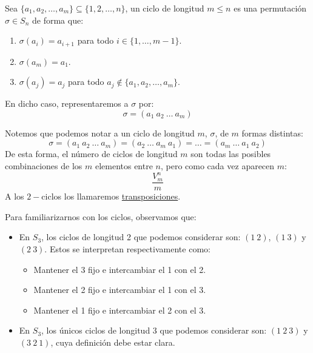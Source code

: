 \begin{definicion}[Ciclo]
    Sea $\{a_1,a_2,\ldots,a_m\}\subseteq \{1,2,\ldots,n\}$, un ciclo de longitud $m\leq n$ es una permutación $\sigma\in S_n$ de forma que:
    \begin{enumerate}
        \item $\sigma(a_i) = a_{i+1}$ para todo $i \in \{1,\ldots,m-1\}$.
        \item $\sigma(a_m) = a_1$.
        \item $\sigma(a_j) = a_j$ para todo $a_j \notin \{a_1,a_2,\ldots,a_m\}$.
    \end{enumerate}
    En dicho caso, representaremos a $\sigma$ por:
    \begin{equation*}
        \sigma = (a_1\ a_2\ \ldots\ a_m)
    \end{equation*}
\end{definicion}

\begin{observacion}
    Notemos que podemos notar a un ciclo de longitud $m$, $\sigma$, de $m$ formas distintas:
    \begin{equation*}
        \sigma = (a_1\ a_2\ \ldots\ a_m) = (a_2\ \ldots\ a_m\ a_1) = \ldots = (a_m\ \ldots\ a_1\ a_2)
    \end{equation*}
    De esta forma, el número de ciclos de longitud $m$ son todas las posibles combinaciones de los $m$ elementos entre $n$, pero como cada vez aparecen $m$:
    \begin{equation*}
        \dfrac{V_m^n}{m}
    \end{equation*}
    A los $2-$ciclos los llamaremos \underline{transposiciones}.
\end{observacion}

\begin{ejemplo}
    Para familiarizarnos con los ciclos, observamos que:
    \begin{itemize}
        \item En $S_3$, los ciclos de longitud 2 que podemos considerar son: $(1\ 2)$, $(1\ 3)$ y $(2\ 3)$. Estos se interpretan respectivamente como:
            \begin{itemize}
                \item Mantener el 3 fijo e intercambiar el 1 con el 2.
                \item Mantener el 2 fijo e intercambiar el 1 con el 3.
                \item Mantener el 1 fijo e intercambiar el 2 con el 3.
            \end{itemize}
        \item En $S_3$, los únicos ciclos de longitud 3 que podemos considerar son: $(1\ 2\ 3)$ y $(3\ 2\ 1)$, cuya definición debe estar clara.
    \end{itemize}
\end{ejemplo}

